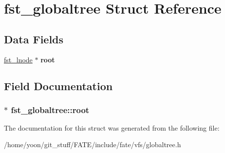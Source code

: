 \hypertarget{structfst__globaltree}{\section{fst\-\_\-globaltree Struct Reference}
\label{structfst__globaltree}
}
\subsection*{Data Fields}
\begin{DoxyCompactItemize}
\item 
\hypertarget{structfst__globaltree_ad7a60f1028946c61aa7b22994c8e5593}{\hyperlink{structfst__lnode}{fst\-\_\-lnode} $\ast$ {\bfseries root}}\label{structfst__globaltree_ad7a60f1028946c61aa7b22994c8e5593}

\end{DoxyCompactItemize}


\subsection{Field Documentation}
\hypertarget{structfst__globaltree_ad7a60f1028946c61aa7b22994c8e5593}{
\subsubsection[{root}]{$\ast$ fst\-\_\-globaltree\-::root}}\label{structfst__globaltree_ad7a60f1028946c61aa7b22994c8e5593}


The documentation for this struct was generated from the following file\-:\begin{DoxyCompactItemize}
\item 
/home/yoon/git\-\_\-stuff/\-F\-A\-T\-E/include/fate/vfs/globaltree.\-h\end{DoxyCompactItemize}
